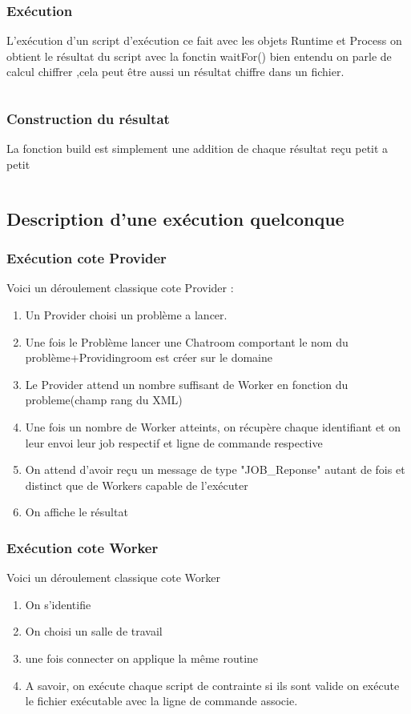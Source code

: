 \documentclass[11pt]{article}
\begin{document}
\subsubsection{Exécution} 
L\textquoteright exécution d'un script d'exécution ce fait avec les objets Runtime et Process on obtient le résultat du script avec la fonctin waitFor() bien entendu on parle de calcul chiffrer ,cela peut être aussi un résultat chiffre dans un fichier. 
\inputminted[tabsize=2,frame=lines,linenos]{Perl}{Fichier_import/calcul.pl}
\newpage
\subsubsection{Construction du résultat} 
La fonction build est simplement une addition de chaque résultat reçu petit a petit 
\inputminted[tabsize=2,frame=lines,linenos]{java}{Fichier_import/build.java}
\newpage
\subsection{Description d'une exécution quelconque} 
\subsubsection{Exécution cote Provider}
Voici un déroulement classique cote Provider :
\begin{enumerate}
\item Un Provider choisi un problème a lancer.
\item Une fois le Problème lancer une Chatroom comportant le nom du problème+Providingroom est créer sur le domaine
\item Le Provider attend un nombre suffisant de Worker en fonction du probleme(champ rang du XML)
\item Une fois un nombre de Worker atteints, on récupère chaque identifiant et on leur envoi leur job respectif et ligne de commande respective
\item On attend d'avoir reçu un message de type "JOB\_Reponse" autant de fois et distinct que de Workers capable de l'exécuter 
\item On affiche le résultat
\end{enumerate}

\subsubsection{Exécution cote Worker}
Voici un déroulement classique cote Worker
\begin{enumerate}
\item On s'identifie
\item On choisi un salle de travail 
\item une fois connecter on applique la même routine 
\item A savoir, on exécute chaque script de contrainte si ils sont valide on exécute le fichier exécutable avec la ligne de commande associe.
\end{enumerate}
\end{document}
